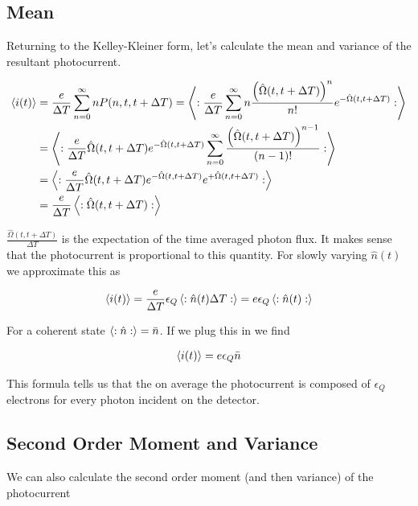 \documentclass[12pt]{article}
\newcommand{\ep}{\epsilon}
\begin{document}
\subsection{Mean}

Returning to the Kelley-Kleiner form, let's calculate the mean and variance of the resultant photocurrent.

\begin{align}
\Braket{i(t)} &= \frac{e}{\Delta T} \sum_{n=0}^{\infty} n P(n,t,t+\Delta T) = \Braket{:\frac{e}{\Delta T} \sum_{n=0}^{\infty} n\frac{\left(\hat{\Omega}(t,t+\Delta T)\right)^n}{n!} e^{-\hat{\Omega}(t,t+\Delta T)}:}\\
&= \Braket{:\frac{e}{\Delta T} \hat{\Omega}(t,t+\Delta T) e^{-\hat{\Omega}(t,t+\Delta T)}\sum_{n=0}^{\infty} \frac{\left(\hat{\Omega}(t,t+\Delta T)\right)^{n-1}}{(n-1)!}:}\\
&= \Braket{:\frac{e}{\Delta T} \hat{\Omega}(t,t+\Delta T) e^{-\hat{\Omega}(t,t+\Delta T)} e^{+\hat{\Omega}(t,t+\Delta T)}:}\\
& = \frac{e}{\Delta T}\Braket{:\hat{\Omega}(t,t+\Delta T):}\\
\end{align}

$\frac{\hat{\Omega}(t,t+\Delta T)}{\Delta T}$ is the expectation of the time averaged photon flux. It makes sense that the photocurrent is proportional to this quantity. For slowly varying $\hat{n}(t)$ we approximate this as

\begin{align}
\Braket{i(t)} = \frac{e}{\Delta T} \ep_Q \Braket{:\hat{n}(t) \Delta T:} = e \ep_Q \Braket{:\hat{n}(t):}
\end{align}

 For a coherent state $\Braket{:\hat{n}:} = \bar{n}$. If we plug this in we find

\begin{align}
\Braket{i(t)} = e \ep_Q \bar{n}
\end{align}

This formula tells us that the on average the photocurrent is composed of $\ep_Q$ electrons for every photon incident on the detector.

\subsection{Second Order Moment and Variance}

We can also calculate the second order moment (and then variance) of the photocurrent
\end{document}
